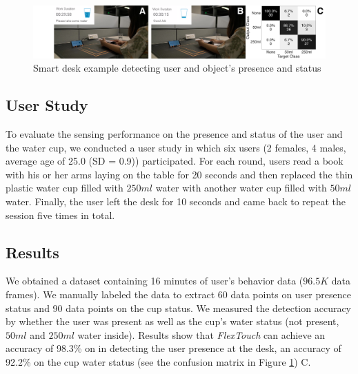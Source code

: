 \begin{figure}[ht]
\centering
  \includegraphics[width=0.95\columnwidth]{figures/FlexTouch-desk.png}
  \setlength{\belowcaptionskip}{-4pt}
  \caption{Smart desk example detecting user and object's presence and status}
  \label{fig:smartdesk}
\end{figure}

\subsection{User Study}
To evaluate the sensing performance on the presence and status of the user and the water cup, we conducted a user study in which six users (2 females, 4 males, average age of 25.0 (SD = 0.9)) participated. For each round, users read a book with his or her arms laying on the table for 20 seconds and then replaced the thin plastic water cup filled with $250 ml$ water with another water cup filled with $50 ml$ water. Finally, the user left the desk for 10 seconds and came back to repeat the session five times in total.

\subsection{Results}
We obtained a dataset containing 16 minutes of user's behavior data ($96.5 K$ data frames). We manually labeled the data to extract 60 data points on user presence status and 90 data points on the cup status. We measured the detection accuracy by whether the user was present as well as the cup's water status (not present, $50 ml$ and $250 ml$ water inside). Results show that \textit{FlexTouch} can achieve an accuracy of 98.3\% on in detecting the user presence at the desk, an accuracy of 92.2\% on the cup water status (see the confusion matrix in Figure \ref{fig:smartdesk}) C.

